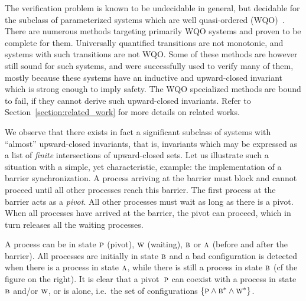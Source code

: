 The verification problem is known to be undecidable in general, but
decidable for the subclass of parameterized systems which are well
quasi-ordered
(WQO)~\cite{Parosh:Bengt:Karlis:Tsay:general,abdulla:well}.
%
There are numerous methods targeting primarily WQO systems and proven
to be complete for them. %
Universally quantified transitions are not monotonic, and systems with
such transitions are not WQO. %
Some of these methods are however still sound for such systems, and
were successfully used to verify many of them, mostly because these
systems have an inductive and upward-closed invariant which is strong
enough to imply safety. %
The WQO specialized methods are bound to fail, if they cannot derive
such upward-closed invariants.
%
Refer to Section~\ref{section:related_work} for more details on
related works.

We observe that there exists in fact a significant subclass of systems
with ``almost'' upward-closed invariants, that is, invariants which
may be expressed as a list %
of \emph{finite} intersections of upward-closed sets.
%
Let us illustrate such a situation with a simple, yet characteristic,
example: the implementation of a barrier synchronization.
%
A process arriving at the barrier must block and cannot proceed until
all other processes reach this barrier.
%
The first process at the barrier acts as a \emph{pivot}. All other
processes must wait as long as there is a pivot. %
%
When all processes have arrived at the barrier, the pivot can proceed,
which in turn releases all the waiting processes.
%

\begin{wrapfigure}{r}{0.28\textwidth}
  \vspace{-24pt}
  \begin{center}
    
  \end{center}
  \label{figure:demo}
  \vspace{-24pt}
\end{wrapfigure}
%
\noindent%
A process can be in state $\textsc{p}$ (pivot), $\textsc{w}$ (waiting), $\textsc{b}$ or
$\textsc{a}$ (before and after the barrier).
%
All processes are initially in state $\textsc{b}$ and %
a bad configuration is detected when there is a process in state $\textsc{a}$,
while there is still a process in state $\textsc{b}$ %
(cf the figure on the right).
%
It is clear that a pivot~$\textsc{p}$ can coexist with a process in state~$\textsc{b}$ and/or $\textsc{w}$, or
is alone, i.e.\ the set of configurations $\{\textsc{p}\wedge\textsc{b}^*\wedge\textsc{w}^*\}$. %

